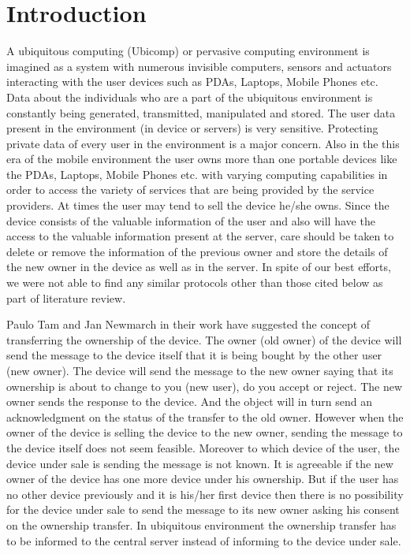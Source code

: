 \documentclass[letterpaper]{article}
\begin{document}
\section{Introduction}
A ubiquitous computing (Ubicomp) or pervasive computing environment is imagined as a system with numerous invisible computers, sensors and actuators interacting with the user devices such as PDAs, Laptops, Mobile Phones etc. Data about the individuals who are a part of the ubiquitous environment is constantly being generated, transmitted, manipulated and stored. The user data present in the environment (in device or servers) is very sensitive. Protecting private data of every user in the environment is a major concern. Also in the this era of the mobile environment the user owns more than one portable devices like the PDAs, Laptops, Mobile Phones etc. with varying computing capabilities in order to access the variety of services that are being provided by the service providers. At times the user may tend to sell the device he/she owns. Since the device consists of the valuable information of the user and also will have the access to the valuable information present at the server, care should be taken to delete or remove the information of the previous owner and store the details of the new owner in the device as well as in the server. In spite of our best efforts, we were not able to find any similar protocols other than those cited below as part of literature review.  
\par
Paulo Tam and Jan Newmarch \cite{ptjn} in their work have suggested the concept of transferring the ownership of the device. The owner (old owner) of the device will send the message to the device itself that it is being bought by the other user (new owner). The device will send the message to the new owner saying that its ownership is about to change to you (new user), do you accept or reject. The new owner sends the response to the device. And the object will in turn send an acknowledgment on the status of the transfer to the old owner. However when the owner of the device is selling the device to the new owner, sending the message to the device itself does not seem feasible. Moreover to which device of the user, the device under sale is sending the message is not known. It is agreeable if the new owner of the device has one more device under his ownership. But if the user has no other device previously and it is his/her first device then there is no possibility for the device under sale to send the message to its new owner asking his consent on the ownership transfer. In ubiquitous environment the ownership transfer has to be informed to the central server instead of informing to the device under sale. 
\end{document}
